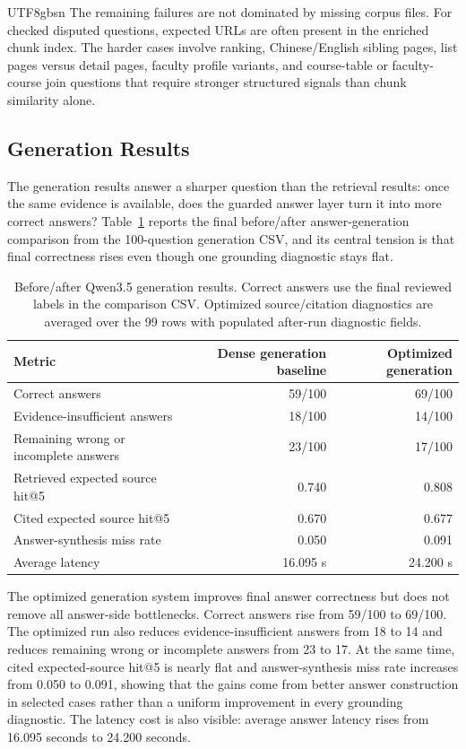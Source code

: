 \documentclass{article}
\begin{document}
\begin{CJK*}{UTF8}{gbsn}
The remaining failures are not dominated by missing corpus files. For checked disputed questions, expected URLs are often present in the enriched chunk index. The harder cases involve ranking, Chinese/English sibling pages, list pages versus detail pages, faculty profile variants, and course-table or faculty-course join questions that require stronger structured signals than chunk similarity alone.

\subsection{Generation Results}

The generation results answer a sharper question than the retrieval results: once the same evidence is available, does the guarded answer layer turn it into more correct answers? Table~\ref{tab:generation-baseline} reports the final before/after answer-generation comparison from the 100-question generation CSV, and its central tension is that final correctness rises even though one grounding diagnostic stays flat.

\begin{table}[H]
\centering
\small
\caption{Before/after Qwen3.5 generation results. Correct answers use the final reviewed labels in the comparison CSV. Optimized source/citation diagnostics are averaged over the 99 rows with populated after-run diagnostic fields.}
\label{tab:generation-baseline}
\begin{tabular}{lrr}
\toprule
Metric & Dense generation baseline & Optimized generation \\
\midrule
Correct answers & 59/100 & 69/100 \\
Evidence-insufficient answers & 18/100 & 14/100 \\
Remaining wrong or incomplete answers & 23/100 & 17/100 \\
Retrieved expected source hit@5 & 0.740 & 0.808 \\
Cited expected source hit@5 & 0.670 & 0.677 \\
Answer-synthesis miss rate & 0.050 & 0.091 \\
Average latency & 16.095 s & 24.200 s \\
\bottomrule
\end{tabular}
\end{table}

The optimized generation system improves final answer correctness but does not remove all answer-side bottlenecks. Correct answers rise from 59/100 to 69/100. The optimized run also reduces evidence-insufficient answers from 18 to 14 and reduces remaining wrong or incomplete answers from 23 to 17. At the same time, cited expected-source hit@5 is nearly flat and answer-synthesis miss rate increases from 0.050 to 0.091, showing that the gains come from better answer construction in selected cases rather than a uniform improvement in every grounding diagnostic. The latency cost is also visible: average answer latency rises from 16.095 seconds to 24.200 seconds.


\end{CJK*}
\end{document}
